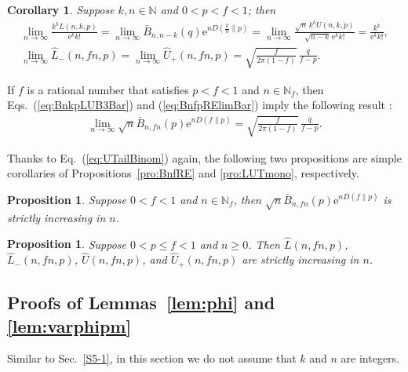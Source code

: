 \documentclass[aop]{imsart}
\theoremstyle{plain}
\newtheorem{corollary}[theorem]{Corollary}
\newtheorem{proposition}[theorem]{Proposition}
\theoremstyle{remark}
\newcommand{\rme}{\mathrm{e}}
\newcommand{\bbN}{\mathbb{N}}
\newcommand{\1}{\operatorname{\uppercase\expandafter{\romannumeral1}}}
\newcommand{\2}{\operatorname{\uppercase\expandafter{\romannumeral2}}}
\newcommand{\3}{\operatorname{\uppercase\expandafter{\romannumeral3}}}
\newcommand{\4}{\operatorname{\uppercase\expandafter{\romannumeral4}}}
\newcommand{\5}{\operatorname{\uppercase\expandafter{\romannumeral5}}}
\newcommand{\6}{\operatorname{\uppercase\expandafter{\romannumeral6}}}
\newcommand{\7}{\operatorname{\uppercase\expandafter{\romannumeral7}}}
\newcommand{\8}{\operatorname{\uppercase\expandafter{\romannumeral8}}}
\newcommand{\9}{\operatorname{\uppercase\expandafter{\romannumeral9}}}
\newcommand{\eref}[1]{Eq.~\textup{(\ref{#1})}}
\newcommand{\eqsref}[2]{Eqs.~(\ref{#1}) and (\ref{#2})}
\newcommand{\lsref}[1]{Lemmas~\ref{#1}}
\newcommand{\psref}[1]{Propositions~\ref{#1}}
\newcommand{\sref}[1]{Sec.~\ref{#1}}
\begin{document}
\begin{corollary}\label{cor:UTailLim}
	Suppose  $k,n\in \bbN$ and   $0<p<f<1$; then 
	\begin{gather}
	\lim_{n\to \infty}	\frac{k^kL(n,k,p)}{\rme^k k!}= \lim_{n\to \infty} \bar{B}_{n,n-k}(q) \rme^{nD(\frac{k}{n}\| p)}= \lim_{n\to \infty} \frac{\sqrt{n}\,k^kU(n,k,p)}{\sqrt{n-k}\,\rme^k k!}=
	\frac{k^k }{\rme^{k} k!},\\
	\lim_{n\rightarrow \infty} \hat{L}_-(n,f n,p)=\lim_{n\rightarrow \infty} \hat{U}_+(n,f n,p)=\sqrt{\frac{f}{2\pi (1-f)}}\,\frac{q}{f-p}.  \label{eq:BnfpRElimBar} 
	\end{gather}
\end{corollary}

If $f$ is a rational number that satisfies $p<f<1$ and $n\in \bbN_f$, then \eqsref{eq:BnkpLUB3Bar}{eq:BnfpRElimBar} imply the following result \cite{AG,BlacH59,BahaR60,DembZ10}:
\begin{gather}
\lim_{n\to \infty}\sqrt{n} \bar{B}_{n,fn}(p) \rme^{ nD(f\| p)}=\sqrt{\frac{f}{2\pi (1-f)}}\,\frac{q}{f-p}. 
\end{gather}

Thanks to \eref{eq:UTailBinom} again, the following two propositions are simple corollaries of  \psref{pro:BnfRE} and \ref{pro:LUTmono}, respectively. 
\begin{proposition}
	Suppose  $0<f<1$ and $n\in \bbN_f$, then  $\sqrt{n}\bar{B}_{n,fn}(p)\rme^{nD(f\| p)}$ is strictly increasing in $n$. 
\end{proposition}


\begin{proposition}
	Suppose $0<p\leq f<1$ and $n\geq 0$.  Then $\hat{L}(n,fn,p)$, $\hat{L}_-(n,fn,p)$, $\hat{U}(n,fn,p)$, and $\hat{U}_+(n,fn,p)$ are  strictly increasing in $n$. 	
\end{proposition}


\subsection{\label{sec:phiProof}Proofs of \lsref{lem:phi} and \ref{lem:varphipm}}
Similar to  \sref{S5-1},
in this section we do not assume that $k$ and $n$ are integers.
\end{document}
